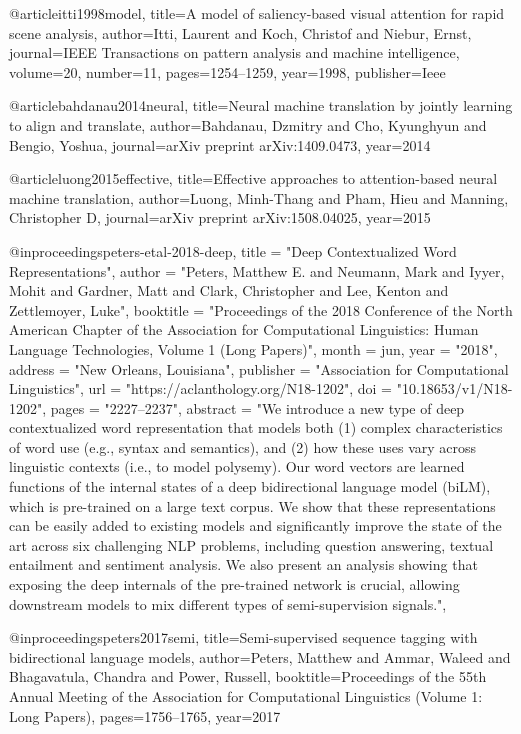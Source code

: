 @article{itti1998model,
  title={A model of saliency-based visual attention for rapid scene analysis},
  author={Itti, Laurent and Koch, Christof and Niebur, Ernst},
  journal={IEEE Transactions on pattern analysis and machine intelligence},
  volume={20},
  number={11},
  pages={1254--1259},
  year={1998},
  publisher={Ieee}
}

@article{bahdanau2014neural,
  title={Neural machine translation by jointly learning to align and translate},
  author={Bahdanau, Dzmitry and Cho, Kyunghyun and Bengio, Yoshua},
  journal={arXiv preprint arXiv:1409.0473},
  year={2014}
}

@article{luong2015effective,
  title={Effective approaches to attention-based neural machine translation},
  author={Luong, Minh-Thang and Pham, Hieu and Manning, Christopher D},
  journal={arXiv preprint arXiv:1508.04025},
  year={2015}
}

@inproceedings{peters-etal-2018-deep,
    title = "Deep Contextualized Word Representations",
    author = "Peters, Matthew E.  and
      Neumann, Mark  and
      Iyyer, Mohit  and
      Gardner, Matt  and
      Clark, Christopher  and
      Lee, Kenton  and
      Zettlemoyer, Luke",
    booktitle = "Proceedings of the 2018 Conference of the North {A}merican Chapter of the Association for Computational Linguistics: Human Language Technologies, Volume 1 (Long Papers)",
    month = jun,
    year = "2018",
    address = "New Orleans, Louisiana",
    publisher = "Association for Computational Linguistics",
    url = "https://aclanthology.org/N18-1202",
    doi = "10.18653/v1/N18-1202",
    pages = "2227--2237",
    abstract = "We introduce a new type of deep contextualized word representation that models both (1) complex characteristics of word use (e.g., syntax and semantics), and (2) how these uses vary across linguistic contexts (i.e., to model polysemy). Our word vectors are learned functions of the internal states of a deep bidirectional language model (biLM), which is pre-trained on a large text corpus. We show that these representations can be easily added to existing models and significantly improve the state of the art across six challenging NLP problems, including question answering, textual entailment and sentiment analysis. We also present an analysis showing that exposing the deep internals of the pre-trained network is crucial, allowing downstream models to mix different types of semi-supervision signals.",
}


@inproceedings{peters2017semi,
  title={Semi-supervised sequence tagging with bidirectional language models},
  author={Peters, Matthew and Ammar, Waleed and Bhagavatula, Chandra and Power, Russell},
  booktitle={Proceedings of the 55th Annual Meeting of the Association for Computational Linguistics (Volume 1: Long Papers)},
  pages={1756--1765},
  year={2017}
}

